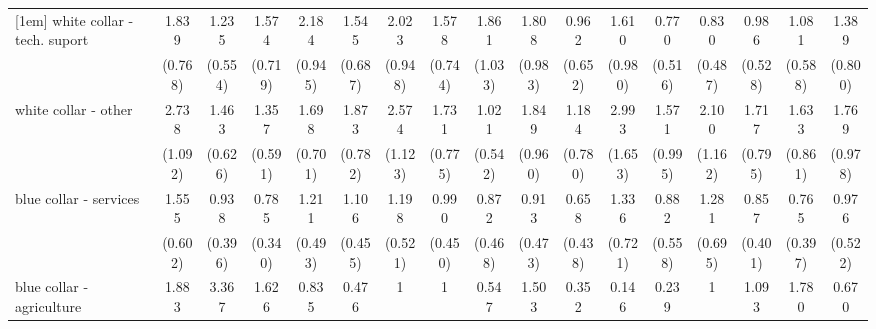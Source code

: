 {\begin{tabular}{l*{16}{c}}
[1em]
white collar - tech. suport&       1.839         &       1.235         &       1.574         &       2.184         &       1.545         &       2.023         &       1.578         &       1.861         &       1.808         &       0.962         &       1.610         &       0.770         &       0.830         &       0.986         &       1.081         &       1.389         \\
                    &     (0.768)         &     (0.554)         &     (0.719)         &     (0.945)         &     (0.687)         &     (0.948)         &     (0.744)         &     (1.033)         &     (0.983)         &     (0.652)         &     (0.980)         &     (0.516)         &     (0.487)         &     (0.528)         &     (0.588)         &     (0.800)         \\
[1em]
white collar - other&       2.738\sym{*}  &       1.463         &       1.357         &       1.698         &       1.873         &       2.574\sym{*}  &       1.731         &       1.021         &       1.849         &       1.184         &       2.993\sym{*}  &       1.571         &       2.100         &       1.717         &       1.633         &       1.769         \\
                    &     (1.092)         &     (0.626)         &     (0.591)         &     (0.701)         &     (0.782)         &     (1.123)         &     (0.775)         &     (0.542)         &     (0.960)         &     (0.780)         &     (1.653)         &     (0.995)         &     (1.162)         &     (0.795)         &     (0.861)         &     (0.978)         \\
[1em]
blue collar - services&       1.555         &       0.938         &       0.785         &       1.211         &       1.106         &       1.198         &       0.990         &       0.872         &       0.913         &       0.658         &       1.336         &       0.882         &       1.281         &       0.857         &       0.765         &       0.976         \\
                    &     (0.602)         &     (0.396)         &     (0.340)         &     (0.493)         &     (0.455)         &     (0.521)         &     (0.450)         &     (0.468)         &     (0.473)         &     (0.438)         &     (0.721)         &     (0.558)         &     (0.695)         &     (0.401)         &     (0.397)         &     (0.522)         \\
[1em]
blue collar - agriculture&       1.883         &       3.367         &       1.626         &       0.835         &       0.476         &           1         &           1         &       0.547         &       1.503         &       0.352         &       0.146         &       0.239         &           1         &       1.093         &       1.780         &       0.670         \\

\end{tabular}}
